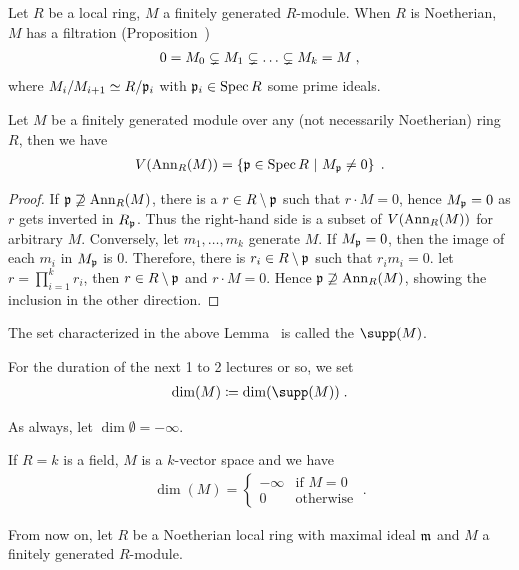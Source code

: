 \documentclass[a4paper,parskip=half,numbers=enddot, DIV=12, headheight=30pt]{scrreprt}
\begin{document}
Let $R$ be a local ring, $M$ a finitely generated $R$-module. When $R$ is Noetherian, $M$ has a filtration (Proposition~)
\begin{align}
    0 = M_0\subsetneq M_1\subsetneq\ldots \subsetneq M_k = M\;, \lbl{eq:filtrationByPrimeIdeals}
\end{align}
where $M_i/M_{i+1} \simeq R/\mathfrak{p}_i$ with $\mathfrak{p}_i\in\operatorname{Spec} R$ some prime ideals.

\begin{lem}
    Let $M$ be a finitely generated module over any (not necessarily Noetherian) ring $R$, then we have
    \begin{align*}
        V(\operatorname{Ann}_R(M)) = \left\{\mathfrak{p}\in \operatorname{Spec} R\ \middle|\  M_{\mathfrak{p}}\neq 0\right\}\;.
    \end{align*}
\end{lem}
\begin{proof}
    If $\mathfrak{p}\not\supseteq \operatorname{Ann}_R(M)$, there is a $r\in R\setminus \mathfrak{p}$ such that $r\cdot M = 0$, hence $M_{\mathfrak{p}}=0$ as $r$ gets inverted in $R_{\mathfrak{p}}$. Thus the right-hand side is a subset of $V(\operatorname{Ann}_R(M))$ for arbitrary $M$. Conversely, let $m_1,\ldots, m_k$ generate $M$. If $M_{\mathfrak{p}} = 0$, then the image of each $m_i$ in $M_{\mathfrak{p}}$ is $0$. Therefore, there is $r_i\in R\setminus \mathfrak{p}$ such that $r_im_i = 0$. let $r = \prod_{i=1}^k r_i$, then $r\in R\setminus \mathfrak{p}$ and $r\cdot M = 0$. Hence $\mathfrak{p}\not\supseteq \operatorname{Ann}_R(M)$, showing the inclusion in the other direction.
\end{proof}

\begin{defi}[Support]
    \begin{alphanumerate}
    \item 
        The set characterized in the above Lemma~ is called the  $\supp(M)$.
    \item  
        For the duration of  the next 1 to 2 lectures or so, we set 
        \begin{align*}
            \dim(M) \coloneqq \dim(\supp(M))\;.
        \end{align*}
    \end{alphanumerate}
\end{defi}
\begin{rem*}
    \begin{alphanumerate}
    \item 
        As always, let $\dim \emptyset = -\infty$.
    \item
        If $R=k$ is a field, $M$ is a $k$-vector space and we have
        \begin{align*}
            \dim(M) = \begin{cases}-\infty & \text{if } M=0 \\ 0 &\text{otherwise}\end{cases}\;.
        \end{align*}
    \end{alphanumerate}
\end{rem*}
From now on, let $R$ be a Noetherian local ring with maximal ideal $\mathfrak{m}$ and $M$ a finitely generated $R$-module.
\end{document}
